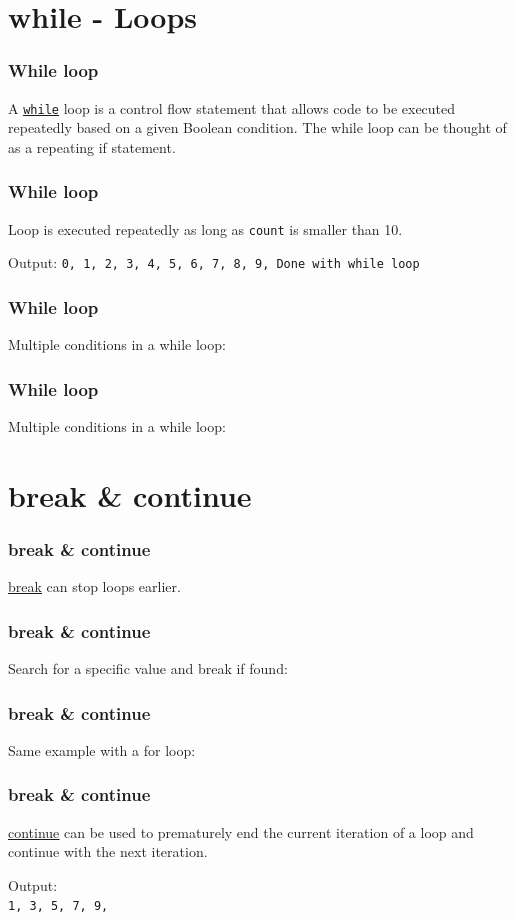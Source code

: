 \documentclass{beamer}
\newcommand{\hrefu}[2]{\underline{\href{#1}{#2}}}
\begin{document}
\section{while - Loops}
\begin{frame}
\frametitle{While loop}
A \hrefu{https://www.w3schools.com/python/python_while_loops.asp}{\texttt{while}} loop is a control flow statement that allows code to be executed repeatedly based on a given Boolean condition. The while loop can be thought of as a repeating if statement. 

\end{frame}
\begin{frame}
  \frametitle{While loop}
  Loop is executed repeatedly as long as \texttt{count} is smaller than 10. 
  
  Output:
  \texttt{0, 1, 2, 3, 4, 5, 6, 7, 8, 9, Done with while loop}
\end{frame} 
\begin{frame}
  \frametitle{While loop}
  Multiple conditions in a while loop: \\
  
\end{frame}
\begin{frame}
  \frametitle{While loop}
  Multiple conditions in a while loop: \\
  
\end{frame}
\section{break \& continue}
\begin{frame}
  \frametitle{break \& continue}
  \hrefu{https://www.w3schools.com/python/ref_keyword_break.asp}{break} can stop loops earlier. 
  
\end{frame}



\begin{frame}
  \frametitle{break \& continue}
  Search for a specific value and break if found: 
  
\end{frame}
\begin{frame}
  \frametitle{break \& continue}
  Same example with a for loop:
  
\end{frame}
\begin{frame}
  \frametitle{break \& continue}
  \hrefu{https://www.w3schools.com/python/ref_keyword_continue.asp}{continue} can be used to prematurely end the current iteration of a loop and continue with the next iteration.
  
  Output: \\
  \texttt{1, 3, 5, 7, 9, }
\end{frame}
\end{document}
